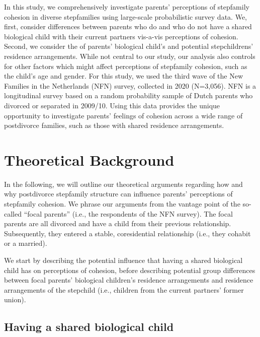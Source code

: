 \documentclass[\pandocDocMode,longtable,floatsintext]{apa6}
\begin{document}
In this study, we comprehensively investigate parents' perceptions of
stepfamily cohesion in diverse stepfamilies using large-scale
probabilistic survey data. We, first, consider differences between
parents who do and who do not have a shared biological child with their
current partners vis-a-vis perceptions of cohesion. Second, we consider
the of parents' biological child's and potential stepchildrens'
residence arrangements. While not central to our study, our analysis
also controls for other factors which might affect perceptions of
stepfamily cohesion, such as the child's age and gender. For this study,
we used the third wave of the New Families in the Netherlands (NFN)
survey, collected in 2020 (N=3,056). NFN is a longitudinal survey based
on a random probability sample of Dutch parents who divorced or
separated in 2009/10. Using this data provides the unique opportunity to
investigate parents' feelings of cohesion across a wide range of
postdivorce families, such as those with shared residence arrangements.

\hypertarget{theoretical-background}{%
\section{Theoretical Background}\label{theoretical-background}}

In the following, we will outline our theoretical arguments regarding
how and why postdivorce stepfamily structure can influence parents'
perceptions of stepfamily cohesion. We phrase our arguments from the
vantage point of the so-called ``focal parents'' (i.e., the respondents
of the NFN survey). The focal parents are all divorced and have a child
from their previous relationship. Subsequently, they entered a stable,
coresidential relationship (i.e., they cohabit or a married).

We start by describing the potential influence that having a shared
biological child has on perceptions of cohesion, before describing
potential group differences between focal parents' biological children's
residence arrangements and residence arrangements of the stepchild
(i.e., children from the current partners' former union).

\hypertarget{having-a-shared-biological-child}{%
\subsection{Having a shared biological
child}\label{having-a-shared-biological-child}}
\end{document}
